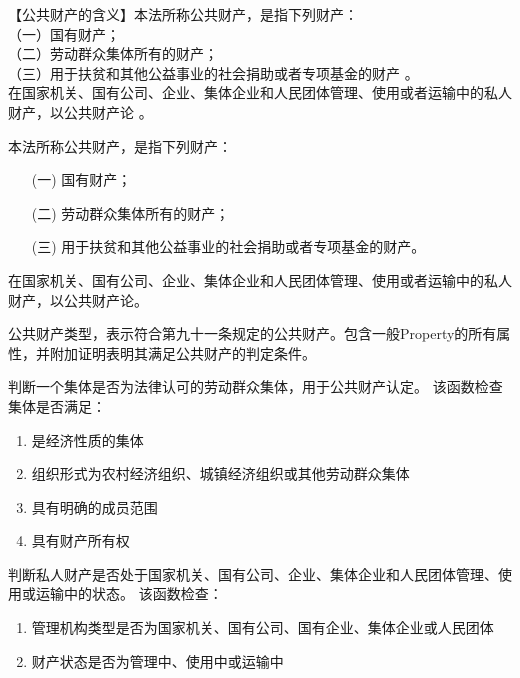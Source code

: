 【公共财产的含义】本法所称公共财产，是指下列财产：\\
（一）国有财产；\\
（二）劳动群众集体所有的财产；\\
（三）用于扶贫和其他公益事业的社会捐助或者专项基金的财产 。\\
在国家机关、国有公司、企业、集体企业和人民团体管理、使用或者运输中的私人财产，以公共财产论 。

\begin{definition}\label{isPublicProperty}
\leanok
{}
本法所称公共财产，是指下列财产：
\begin{enumerate}
\item[(一)] 国有财产；
\item[(二)] 劳动群众集体所有的财产；
\item[(三)] 用于扶贫和其他公益事业的社会捐助或者专项基金的财产。
\end{enumerate}
在国家机关、国有公司、企业、集体企业和人民团体管理、使用或者运输中的私人财产，以公共财产论。
\end{definition}

\begin{definition}\label{PublicProperty}
\leanok
{}
公共财产类型，表示符合第九十一条规定的公共财产。包含一般Property的所有属性，并附加证明表明其满足公共财产的判定条件。
\end{definition}

\begin{definition}\label{isLegalCollective}
\leanok
{}
判断一个集体是否为法律认可的劳动群众集体，用于公共财产认定。
该函数检查集体是否满足：
\begin{enumerate}
\item 是经济性质的集体
\item 组织形式为农村经济组织、城镇经济组织或其他劳动群众集体
\item 具有明确的成员范围
\item 具有财产所有权
\end{enumerate}
\end{definition}

\begin{definition}\label{isInSpecialState}
\leanok
{}
判断私人财产是否处于国家机关、国有公司、企业、集体企业和人民团体管理、使用或运输中的状态。
该函数检查：
\begin{enumerate}
\item 管理机构类型是否为国家机关、国有公司、国有企业、集体企业或人民团体
\item 财产状态是否为管理中、使用中或运输中
\end{enumerate}
\end{definition}

